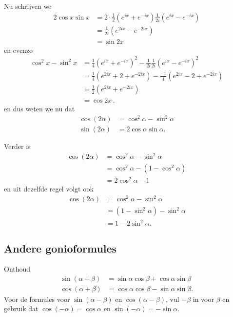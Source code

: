 Nu schrijven we
\begin{align*}
    2 \cos x \sin x &= 2 \cdot \frac 1 2 \left( e^{i x} + e^{-ix} \right) \frac 1 {2i} \left( e^{ix} - e^{-ix} \right) \\
    &= \frac 1 {2i} \left(e^{2 i x} - e^{-2ix} \right) \\
    &= \sin 2 x
\end{align*}
en evenzo
\begin{align*}
    \cos^2 x - \sin^2 x &= \frac 1 4 \left( e^{ix} + e^{-ix} \right)^2 - \frac 1 {2i} \frac 1 {2i} \left( e^{ix} - e^{-ix} \right)^2 \\
    &= \frac 1 4 \left( e^{2ix} + 2 + e^{-2ix} \right) - \frac {-1} {4} \left( e^{2ix} - 2 + e^{-2ix} \right) \\
    &= \frac {1} {2} \left( e^{2ix} + e^{-2ix} \right) \\
    &= \cos 2x \,.
\end{align*}
en dus weten we nu dat
\begin{align}
    \label{verdubbeling1}
    \cos (2\alpha) &= \cos^2 \alpha - \sin^2 \alpha \\
    \sin (2\alpha) &= 2 \cos \alpha \sin \alpha. \label{verdubbeling2}
\end{align}


Verder is
\begin{align*}
    \cos (2 \alpha) &= \cos^2 \alpha - \sin^2 \alpha \\
    &= \cos^2 \alpha - (1 - \cos^2 \alpha ) \\
    &= 2  \cos^2 \alpha - 1
\end{align*}
en uit dezelfde regel volgt ook
\begin{align*}
    \cos (2 \alpha) &= \cos^2 \alpha - \sin^2 \alpha \\
    &= (1 - \sin^2 \alpha) - \sin^2 \alpha \\
    &= 1 - 2 \sin^2 \alpha .
\end{align*}

\subsection{Andere gonioformules}

Onthoud
\begin{align*}
    \sin(\alpha + \beta) &= \sin \alpha \cos \beta + \cos \alpha \sin \beta \\
    \cos(\alpha + \beta) &= \cos \alpha \cos \beta - \sin \alpha \sin \beta .
\end{align*}
Voor de formules voor $\sin(\alpha - \beta)$ en $\cos(\alpha - \beta)$, vul $-\beta$ in voor $\beta$ en gebruik dat $\cos (-\alpha) = \cos \alpha $ en $\sin (-\alpha) = - \sin \alpha $.

